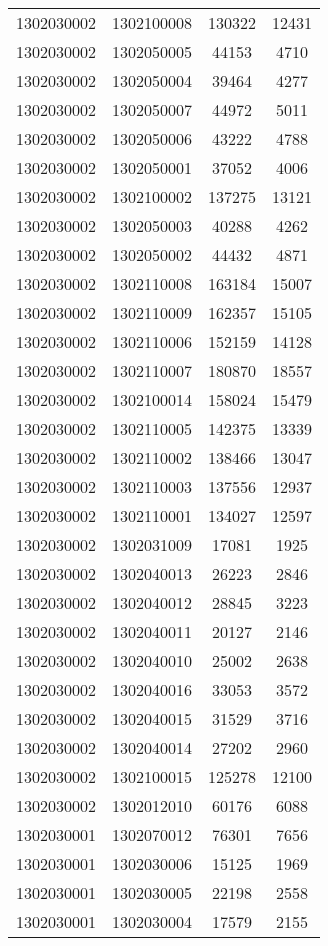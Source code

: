 \begin{longtable}{llcc}
1302030002 & 1302100008 & 130322 & 12431\\
1302030002 & 1302050005 & 44153 & 4710\\
1302030002 & 1302050004 & 39464 & 4277\\
1302030002 & 1302050007 & 44972 & 5011\\
1302030002 & 1302050006 & 43222 & 4788\\
1302030002 & 1302050001 & 37052 & 4006\\
1302030002 & 1302100002 & 137275 & 13121\\
1302030002 & 1302050003 & 40288 & 4262\\
1302030002 & 1302050002 & 44432 & 4871\\
1302030002 & 1302110008 & 163184 & 15007\\
1302030002 & 1302110009 & 162357 & 15105\\
1302030002 & 1302110006 & 152159 & 14128\\
1302030002 & 1302110007 & 180870 & 18557\\
1302030002 & 1302100014 & 158024 & 15479\\
1302030002 & 1302110005 & 142375 & 13339\\
1302030002 & 1302110002 & 138466 & 13047\\
1302030002 & 1302110003 & 137556 & 12937\\
1302030002 & 1302110001 & 134027 & 12597\\
1302030002 & 1302031009 & 17081 & 1925\\
1302030002 & 1302040013 & 26223 & 2846\\
1302030002 & 1302040012 & 28845 & 3223\\
1302030002 & 1302040011 & 20127 & 2146\\
1302030002 & 1302040010 & 25002 & 2638\\
1302030002 & 1302040016 & 33053 & 3572\\
1302030002 & 1302040015 & 31529 & 3716\\
1302030002 & 1302040014 & 27202 & 2960\\
1302030002 & 1302100015 & 125278 & 12100\\
1302030002 & 1302012010 & 60176 & 6088\\
1302030001 & 1302070012 & 76301 & 7656\\
1302030001 & 1302030006 & 15125 & 1969\\
1302030001 & 1302030005 & 22198 & 2558\\
1302030001 & 1302030004 & 17579 & 2155\\

\end{longtable}
